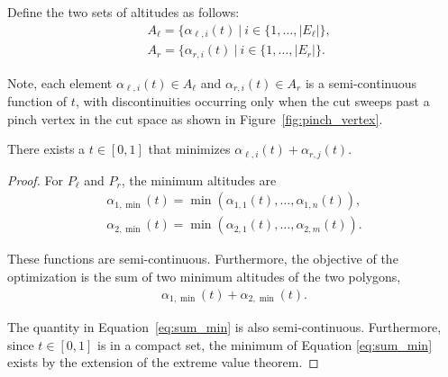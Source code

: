\documentclass[../main.tex]{subfiles}
\begin{document}
Define the two sets of altitudes as follows:
\begin{equation}
\begin{aligned}
\label{eq:set_of_altitudes}
&A_{\ell}=\{\alpha_{\ell,i}(t)\ |\ i\in\{1,\ldots,|E_{\ell}|\},\\
&A_{r}=\{\alpha_{r,i}(t)\ |\ i\in\{1,\ldots,|E_r|\}.
\end{aligned}
\end{equation}


Note, each element $\alpha_{\ell,i}(t)\in A_{\ell}$ and $\alpha_{r,i}(t)\in A_r$ is a semi-continuous function of $t$, with discontinuities occurring only when the cut sweeps past a pinch vertex in the cut space as shown in Figure~\ref{fig:pinch_vertex}.

\begin{lemma}
There exists a $t\in[0,1]$ that minimizes $\alpha_{\ell,i}(t)+\alpha_{r,j}(t)$.
\end{lemma}
\begin{proof}
For $P_{\ell}$ and $P_r$, the minimum altitudes are
\begin{equation}
\begin{aligned}
\alpha_{1,\min}(t)=\min(\alpha_{1,1}(t),\ldots,\alpha_{1,n}(t)),\\
\alpha_{2,\min}(t)=\min(\alpha_{2,1}(t),\ldots,\alpha_{2,m}(t)).
\end{aligned}
\end{equation}


These functions are semi-continuous. Furthermore, the objective of the optimization is the sum of two minimum altitudes of the two polygons,
\begin{equation}
\begin{aligned}
\label{eq:sum_min}
\alpha_{1,\min}(t)+\alpha_{2,\min}(t).
\end{aligned}
\end{equation}

The quantity in Equation~\ref{eq:sum_min} is also semi-continuous. Furthermore, since $t\in[0,1]$ is in a compact set, the minimum of Equation \ref{eq:sum_min} exists by the extension of the extreme value theorem.
\end{proof}
\end{document}
